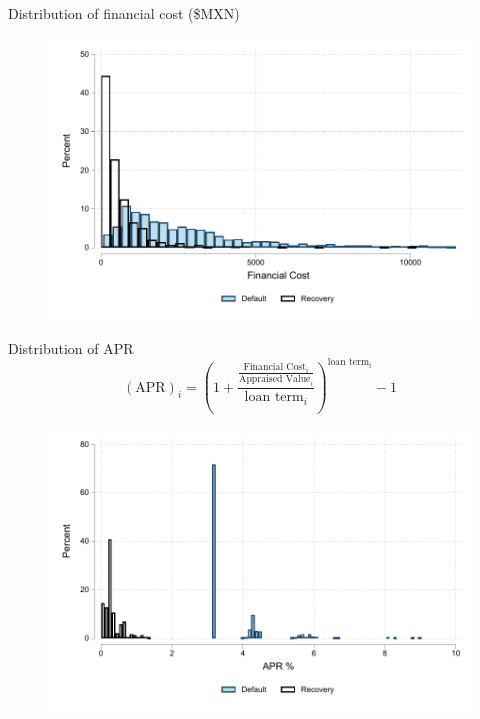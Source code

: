 \documentclass[8pt]{beamer}
\begin{document}
\begin{frame}{Distribution of financial cost (\$MXN)}
    \begin{figure}
     \centering
        \includegraphics[width=.8\textwidth]{Figuras/hist_fc.pdf}
    \end{figure}
\end{frame}


\begin{frame}{Distribution of APR}
\vspace{.2in}
\begin{equation*}
    (\text{APR})_i =\left( 1 + \frac{\frac{\text{Financial Cost}_i}{\text{Appraised Value}_i}}{\text{loan term}_i}\right)^{\text{loan term}_i}-1
\end{equation*}
\vspace{.2in}
\begin{figure}
     \centering
        \includegraphics[width=.75\textwidth]{Figuras/hist_apr.pdf}
    \end{figure}
\end{frame}
\end{document}
